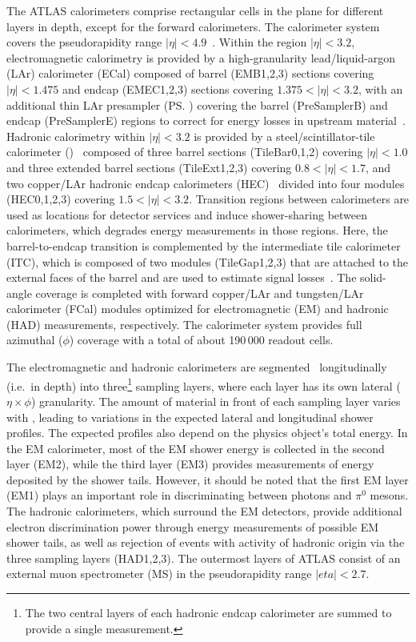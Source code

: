 The ATLAS calorimeters comprise rectangular cells in the
\etaphi plane for different layers in depth, except for the forward calorimeters. The calorimeter system covers the pseudorapidity range \(|\eta| < 4.9\)~\cite{PERF-2007-01}. Within the region $|\eta|< 3.2$, electromagnetic calorimetry is provided by a high-granularity lead/liquid-argon (LAr) calorimeter (ECal) composed of barrel (EMB1,2,3) sections covering $|\eta|<1.475$ and endcap (EMEC1,2,3) sections covering $1.375<|\eta|<3.2$, with an additional thin LAr presampler (\ps) covering the barrel (PreSamplerB) and endcap (PreSamplerE) regions to correct for energy losses in upstream material~\cite{LARG-2009-01,larg_tdr}. Hadronic calorimetry within $|\eta|< 3.2$ is provided by a steel/scintillator-tile calorimeter (\tilecal)~\cite{TCAL-2017-01,tile_tdr} composed of three barrel sections (TileBar0,1,2) covering $|\eta| < 1.0$ and three extended barrel sections (TileExt1,2,3) covering $0.8<|\eta|< 1.7$, and two copper/LAr hadronic endcap calorimeters (HEC)~\cite{cal_tdr} divided into four modules (HEC0,1,2,3) covering $1.5<|\eta|< 3.2$. Transition regions between calorimeters are used as locations for detector services and induce shower-sharing between calorimeters, which degrades energy measurements in those regions. Here, the barrel-to-endcap transition is complemented by the intermediate tile calorimeter (ITC), which is composed of two modules (TileGap1,2,3) that are attached to the external faces of the barrel and are used to estimate signal losses~\cite{cal_tdr}. The solid-angle coverage is completed with forward
copper/LAr and tungsten/LAr calorimeter (FCal) modules optimized for electromagnetic (EM) and hadronic (HAD) measurements, respectively. The calorimeter system
provides full azimuthal ($\phi$) coverage with a total of about 190\,000 readout cells. 



The electromagnetic and hadronic calorimeters are segmented~\cite{PERF-2007-01} longitudinally (i.e.\ in depth) into three\footnote{The two central layers of each hadronic endcap calorimeter are summed to provide a single measurement.} sampling layers, where each layer has its own lateral ($\eta\times\phi$) granularity. The amount of material in front of each sampling layer varies with \abseta, leading to variations in the expected lateral and longitudinal shower profiles. The expected profiles also depend on the physics object's total energy. In the EM calorimeter, most of the EM shower energy is collected in the second layer (EM2), while the third layer (EM3) provides measurements of energy deposited by the shower tails. However, it should be noted that the first EM layer (EM1) plays an important role in discriminating between photons and $\pi^0$ mesons. The hadronic calorimeters, which surround the EM detectors, provide additional electron discrimination power through energy measurements of possible EM shower tails, as well as rejection of events with activity of hadronic origin via the three sampling layers (HAD1,2,3). The outermost layers of ATLAS consist of an external muon spectrometer (MS) in the pseudorapidity range $|eta|<2.7$. 


